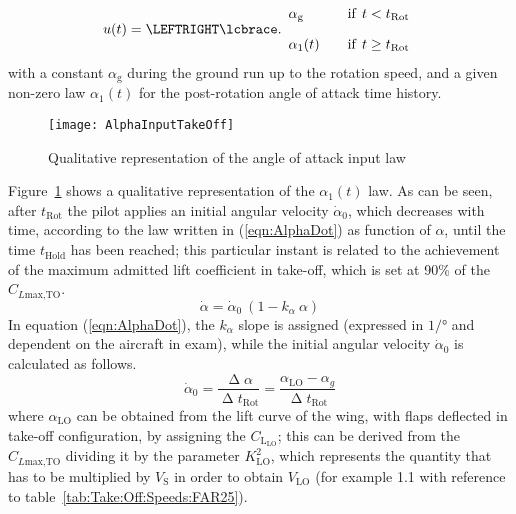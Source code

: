 \bigskip
\begin{equation}\label{eq:Take:Off:System:Dynamics:Alpha:Law}
u (t) =
    \LEFTRIGHT\lcbrace.{
      \begin{array}{l@{\rule{2em}{0pt}}l} 
        \alpha_{\text{g}}
          & \text{if} \;\, t < t_{\text{Rot}}
        \\[1em]
        \alpha_1(t)
          & \text{if} \;\, t \geq t_{\text{Rot}}
      \end{array}
    }
\end{equation}
%
with a constant $\alpha_{\text{g}}$ during the ground run up to the rotation speed, and a given non-zero law $\alpha_1(t)$ for the post-rotation angle of attack time history. 
%
\begin{figure}[!t]
\centering
\texttt{[image: AlphaInputTakeOff]}
\caption{Qualitative representation of the angle of attack input law}
\label{fig:AlphaInput}
\end{figure}
%
Figure~\ref{fig:AlphaInput} shows a qualitative representation of the $\alpha_1(t)$ law. As can be seen, after $t_{\text{Rot}}$ the pilot applies an initial angular velocity $\dot\alpha_{0}$, which decreases with time, according to the law written in (\ref{eqn:AlphaDot}) as function of $\alpha$, until the time $t_{\text{Hold}}$ has been reached; this particular instant is related to the achievement of the maximum admitted lift coefficient in take-off, which is set at 90\% of the $C_{L\text{max,TO}}$.
%
\begin{equation}
\dot\alpha=\dot\alpha_0\ \left(1-k_\alpha\ \alpha\right)
\label{eqn:AlphaDot}
\end{equation}
%
\noindent
In equation (\ref{eqn:AlphaDot}), the $k_\alpha$ slope is assigned (expressed in $\si{1/\degree}$ and dependent on the aircraft in exam), while the initial angular velocity $\dot\alpha_0$ is calculated as follows.
%
\begin{equation}
\dot\alpha_0=\dfrac{\upDelta\alpha}{\upDelta t_{\text{Rot}}}=\dfrac{\alpha_{\text{LO}}-\alpha_g}{\upDelta t_{\text{Rot}}}
\label{eqn:AlphaDotInitial}
\end{equation}
%
where $\alpha_{\text{LO}}$ can be obtained from the lift curve of the wing, with flaps deflected in take-off configuration, by assigning the $C_{\text{L}_{\text{LO}}}$; this can be derived from the $C_{L\text{max,TO}}$ dividing it by the parameter $K^2_{\text{LO}}$, which represents the quantity that has to be multiplied by $V_{\text{S}}$ in order to obtain $V_{\text{LO}}$ (for example 1.1 with reference to table~\ref{tab:Take:Off:Speeds:FAR25}).

